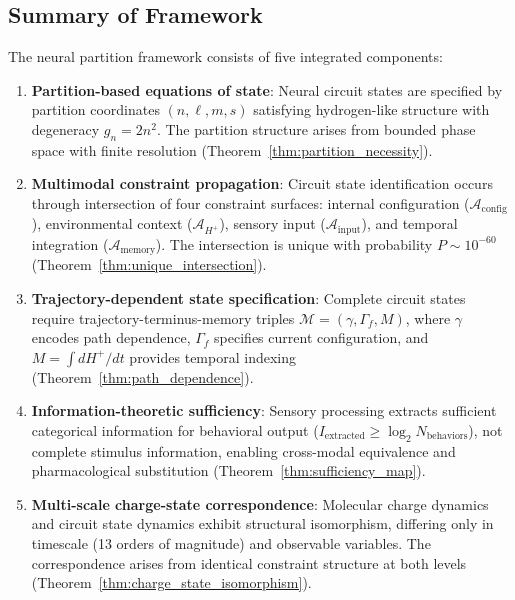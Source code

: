 \documentclass[aps,prd,twocolumn,superscriptaddress,floatfix,nofootinbib]{revtex4-2}
\theoremstyle{remark}
\begin{document}
\subsection{Summary of Framework}

The neural partition framework consists of five integrated components:

\begin{enumerate}
\item \textbf{Partition-based equations of state}: Neural circuit states are specified by partition coordinates $(n, \ell, m, s)$ satisfying hydrogen-like structure with degeneracy $g_n = 2n^2$. The partition structure arises from bounded phase space with finite resolution (Theorem~\ref{thm:partition_necessity}).

\item \textbf{Multimodal constraint propagation}: Circuit state identification occurs through intersection of four constraint surfaces: internal configuration ($\mathcal{A}_{\text{config}}$), environmental context ($\mathcal{A}_{H^+}$), sensory input ($\mathcal{A}_{\text{input}}$), and temporal integration ($\mathcal{A}_{\text{memory}}$). The intersection is unique with probability $P \sim 10^{-60}$ (Theorem~\ref{thm:unique_intersection}).

\item \textbf{Trajectory-dependent state specification}: Complete circuit states require trajectory-terminus-memory triples $\mathcal{M} = (\gamma, \Gamma_f, M)$, where $\gamma$ encodes path dependence, $\Gamma_f$ specifies current configuration, and $M = \int dH^+/dt$ provides temporal indexing (Theorem~\ref{thm:path_dependence}).

\item \textbf{Information-theoretic sufficiency}: Sensory processing extracts sufficient categorical information for behavioral output ($I_{\text{extracted}} \geq \log_2 N_{\text{behaviors}}$), not complete stimulus information, enabling cross-modal equivalence and pharmacological substitution (Theorem~\ref{thm:sufficiency_map}).

\item \textbf{Multi-scale charge-state correspondence}: Molecular charge dynamics and circuit state dynamics exhibit structural isomorphism, differing only in timescale (13 orders of magnitude) and observable variables. The correspondence arises from identical constraint structure at both levels (Theorem~\ref{thm:charge_state_isomorphism}).
\end{enumerate}
\end{document}
